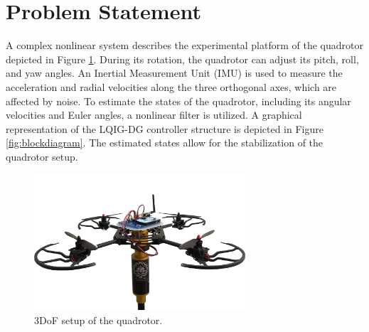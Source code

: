 \documentclass[3p,times]{elsarticle}
\begin{document}
\section{Problem Statement}\label{sec:problem}
A complex nonlinear system describes the experimental platform of the quadrotor depicted in Figure \ref{fig:quadrotor}.
During its rotation, the quadrotor can adjust its pitch, roll, and yaw angles.
 An Inertial Measurement Unit (IMU) is used to measure the acceleration and radial velocities along the three orthogonal axes, which are affected by noise.
 To estimate the states of the quadrotor, including its angular velocities and Euler angles, a nonlinear filter is utilized. %
A graphical representation of the LQIG-DG controller structure is depicted in Figure \ref{fig:blockdiagram}. The estimated states allow for the stabilization of the quadrotor setup.
\begin{figure}[H]
   \centering
   \includegraphics[width=0.7\textwidth]{../Figure/3DOFQuad.png}
   \caption{3DoF setup of the quadrotor.}
   \label{fig:quadrotor}
\end{figure}
\end{document}
